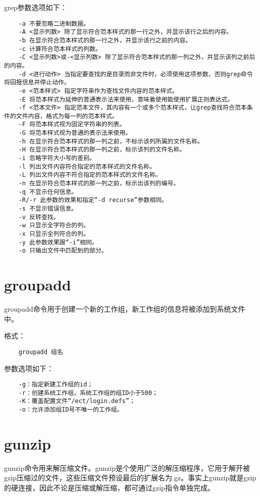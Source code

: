 \documentclass[a4paper,left=2.5cm,right=2.5cm,11pt]{article}
\begin{document}
	grep参数选项如下：
	\begin{lstlisting}
	-a 不要忽略二进制数据。 
	-A <显示列数> 除了显示符合范本样式的那一行之外，并显示该行之后的内容。 
	-b 在显示符合范本样式的那一行之外，并显示该行之前的内容。 
	-c 计算符合范本样式的列数。 
	-C <显示列数>或-<显示列数> 除了显示符合范本样式的那一列之外，并显示该列之前后的内容。 
	-d <进行动作> 当指定要查找的是目录而非文件时，必须使用这项参数，否则grep命令将回报信息并停止动作。 
	-e <范本样式> 指定字符串作为查找文件内容的范本样式。 
	-E 将范本样式为延伸的普通表示法来使用，意味着使用能使用扩展正则表达式。 
	-f <范本文件> 指定范本文件，其内容有一个或多个范本样式，让grep查找符合范本条件的文件内容，格式为每一列的范本样式。 
	-F 将范本样式视为固定字符串的列表。 
	-G 将范本样式视为普通的表示法来使用。 
	-h 在显示符合范本样式的那一列之前，不标示该列所属的文件名称。 
	-H 在显示符合范本样式的那一列之前，标示该列的文件名称。 
	-i 忽略字符大小写的差别。 
	-l 列出文件内容符合指定的范本样式的文件名称。 
	-L 列出文件内容不符合指定的范本样式的文件名称。 
	-n 在显示符合范本样式的那一列之前，标示出该列的编号。 
	-q 不显示任何信息。 
	-R/-r 此参数的效果和指定“-d recurse”参数相同。 
	-s 不显示错误信息。 
	-v 反转查找。 
	-w 只显示全字符合的列。 
	-x 只显示全列符合的列。 
	-y 此参数效果跟“-i”相同。 
	-o 只输出文件中匹配到的部分。
	\end{lstlisting}

\section{groupadd}
	groupadd命令用于创建一个新的工作组，新工作组的信息将被添加到系统文件中。\par

	格式：
	\begin{lstlisting}
	groupadd 组名
	\end{lstlisting}

	参数选项如下：
	\begin{lstlisting}
	-g：指定新建工作组的id； 
	-r：创建系统工作组，系统工作组的组ID小于500； 
	-K：覆盖配置文件“/ect/login.defs”； 
	-o：允许添加组ID号不唯一的工作组。
	\end{lstlisting}

\section{gunzip}
	gunzip命令用来解压缩文件。gunzip是个使用广泛的解压缩程序，它用于解开被gzip压缩过的文件，这些压缩文件预设最后的扩展名为.gz。事实上gunzip就是gzip的硬连接，因此不论是压缩或解压缩，都可通过gzip指令单独完成。\par
\end{document}
